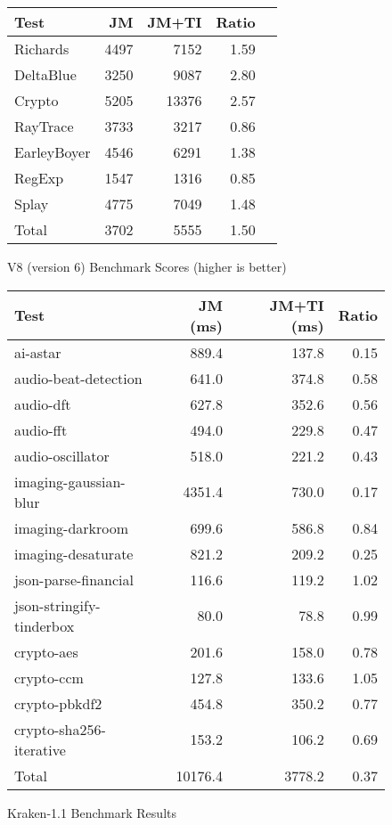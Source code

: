 \begin{figure}
\centering
\begin{tabular}{lrrrr}
\toprule
Test & JM & JM+TI & Ratio \\
\midrule
Richards & 4497 & 7152 & 1.59 \\
DeltaBlue & 3250 & 9087 & 2.80 \\
Crypto & 5205 & 13376 & 2.57 \\
RayTrace & 3733 & 3217 & 0.86 \\
EarleyBoyer & 4546 & 6291 & 1.38 \\
RegExp & 1547 & 1316 & 0.85 \\
Splay & 4775 & 7049 & 1.48 \\
\midrule
Total & 3702 & 5555 & 1.50 \\
\bottomrule
\end{tabular}
\nocaptionrule \caption{V8 (version 6) Benchmark Scores (higher is better)}
\label{fig:v8bench}
\end{figure}

\begin{figure}
\centering
\begin{tabular}{lrrr}
\toprule
Test & JM (ms) & JM+TI (ms) & Ratio \\
\midrule
ai-astar & 889.4 & 137.8 & 0.15 \\
audio-beat-detection & 641.0 & 374.8 & 0.58 \\
audio-dft & 627.8 & 352.6 & 0.56 \\
audio-fft & 494.0 & 229.8 & 0.47 \\
audio-oscillator & 518.0 & 221.2 & 0.43 \\
imaging-gaussian-blur & 4351.4 & 730.0 & 0.17 \\
imaging-darkroom & 699.6 & 586.8 & 0.84 \\
imaging-desaturate & 821.2 & 209.2 & 0.25 \\
json-parse-financial & 116.6 & 119.2 & 1.02 \\
json-stringify-tinderbox & 80.0 & 78.8 & 0.99 \\
crypto-aes & 201.6 & 158.0 & 0.78 \\
crypto-ccm & 127.8 & 133.6 & 1.05 \\
crypto-pbkdf2 & 454.8 & 350.2 & 0.77 \\
crypto-sha256-iterative & 153.2 & 106.2 & 0.69 \\
\midrule
Total & 10176.4 & 3778.2 & 0.37 \\
\bottomrule
\end{tabular}
\nocaptionrule \caption{Kraken-1.1 Benchmark Results}
\label{fig:kraken}
\end{figure}


